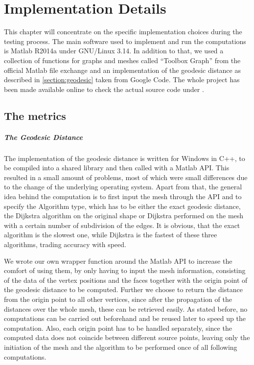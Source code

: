 \chapter{Implementation Details}
\label{chapter:implementation}

This chapter will concentrate on the specific implementation choices during the testing process.
The main software used to implement and  run the computations is Matlab R2014a under GNU/Linux 3.14.
In addition to that, we used a collection of functions for graphs and meshes called ``Toolbox Graph'' from the official Matlab file exchange\cite{online_toolbox} and an implementation of the geodesic distance as described in \ref{section:geodesic} taken from Google Code\cite{online_geodesic}.
The whole project has been made available online to check the actual source code under \cite{online_github}.

\section{The metrics}
\paragraph{The Geodesic Distance}
The implementation of the geodesic distance is written for Windows in C++, to be compiled into a shared library and then called with a Matlab API.
This resulted in a small amount of problems, most of which were small differences due to the change of the underlying operating system.
Apart from that, the general idea behind the computation is to first input the mesh through the API and to specify the Algorithm type, which has to be either the exact geodesic distance, the Dijkstra algorithm on the original shape or Dijkstra performed on the mesh with a certain number of subdivision of the edges.
It is obvious, that the exact algorithm is the slowest one, while Dijkstra is the fastest of these three algorithms, trading accuracy with speed.

We wrote our own wrapper function around the Matlab API to increase the comfort of using them, by only having to input the mesh information, consisting of the data of the vertex positions and the faces together with the origin point of the geodesic distance to be computed.
Further we choose to return the distance from the origin point to all other vertices, since after the propagation of the distances over the whole mesh, these can be retrieved easily.
As stated before, no computations can be carried out beforehand and be reused later to speed up the computation.
Also, each origin point has to be handled separately, since the computed data does not coincide between different source points, leaving only the initiation of the mesh and the algorithm to be performed once of all following computations.

